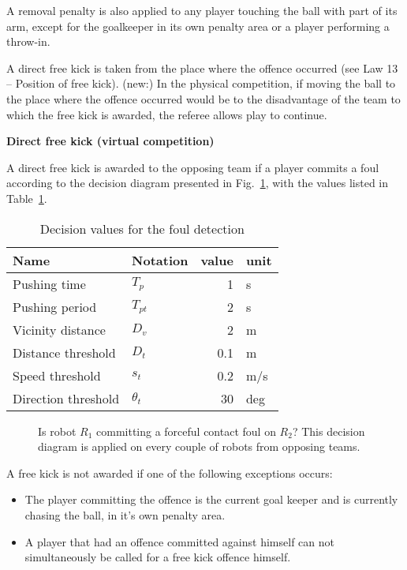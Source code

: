 \bigskip

A removal penalty is also applied to any player touching the ball with
  part of its arm, except for the goalkeeper in its own penalty area or a player
  performing a throw-in.


\bigskip


A direct free kick is taken from the place where the offence occurred (see Law 13 -- Position of free kick).
(new:) In the physical competition, if moving the ball to the place where the offence occurred would be to the disadvantage of the team to which the free kick is awarded, the referee allows play to continue.


{\bfseries Direct free kick (virtual competition)}

\headlinebox

A direct free kick is awarded to the opposing team if a player commits
a foul according to the decision diagram presented in
Fig.~\ref{fig:forceful_contact}, with the values listed in
Table~\ref{tab:forceful_contact}.

\begin{table}[h]
  \caption{\label{tab:forceful_contact}Decision values for the foul detection}
  \centering
  \begin{tabular}{|l l r l|}
    \hline
    Name & Notation & value & unit\\
    \hline
    Pushing time & $T_p$ & 1 & s\\
    Pushing period & $T_{pt}$ & 2 & s\\
    Vicinity distance & $D_v$ & 2 & m\\
    Distance threshold & $D_t$ & 0.1 & m\\
    Speed threshold & $s_t$ & 0.2 & m/s\\
    Direction threshold & $\theta_t$ & 30 & deg\\
    \hline
  \end{tabular}
\end{table}

\begin{figure}[h]
  \centering
  
  \caption{\label{fig:forceful_contact}
  Is robot $R_1$ committing a forceful contact foul on $R_2$?
  This decision diagram is applied on every couple of robots from opposing
  teams.}
\end{figure}


A free kick is not awarded if one of the following exceptions occurs:
\begin{itemize}
    \item The player committing the offence is the current goal keeper and is currently chasing the ball, in it's own penalty area.
  \item A player that had an offence committed against himself can not simultaneously be called for a free kick offence himself.
\end{itemize}

